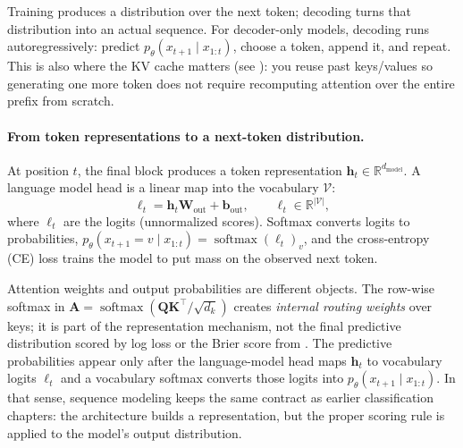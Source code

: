 Training produces a distribution over the next token; decoding turns that distribution into an actual sequence. For decoder-only models, decoding runs autoregressively: predict \(p_\theta(x_{t+1}\mid x_{1:t})\), choose a token, append it, and repeat. This is also where the KV cache matters (see ): you reuse past keys/values so generating one more token does not require recomputing attention over the entire prefix from scratch.

\paragraph{From token representations to a next-token distribution.}
At position \(t\), the final block produces a token representation \(\mathbf{h}_t\in\mathbb{R}^{d_{\text{model}}}\). A language model head is a linear map into the vocabulary \(\mathcal{V}\):
\begin{equation}
    \boldsymbol{\ell}_t = \mathbf{h}_t \mathbf{W}_{\text{out}} + \mathbf{b}_{\text{out}}, \qquad
    \boldsymbol{\ell}_t \in \mathbb{R}^{|\mathcal{V}|},
    \label{eq:transformers_lm_head_logits}
\end{equation}
where \(\boldsymbol{\ell}_t\) are the logits (unnormalized scores). Softmax converts logits to probabilities,
\(p_\theta(x_{t+1}=v\mid x_{1:t})=\operatorname{softmax}(\boldsymbol{\ell}_t)_v\),
and the cross-entropy (CE) loss trains the model to put mass on the observed next token.

\begin{tcolorbox}[summarybox, title={Where the proper-scoring story reappears}]
Attention weights and output probabilities are different objects. The row-wise softmax in \(\mathbf{A}=\operatorname{softmax}(\mathbf{Q}\mathbf{K}^\top/\sqrt{d_k})\) creates \emph{internal routing weights} over keys; it is part of the representation mechanism, not the final predictive distribution scored by log loss or the Brier score from . The predictive probabilities appear only after the language-model head maps \(\mathbf{h}_t\) to vocabulary logits \(\boldsymbol{\ell}_t\) and a vocabulary softmax converts those logits into \(p_\theta(x_{t+1}\mid x_{1:t})\). In that sense, sequence modeling keeps the same contract as earlier classification chapters: the architecture builds a representation, but the proper scoring rule is applied to the model's output distribution.
\end{tcolorbox}

